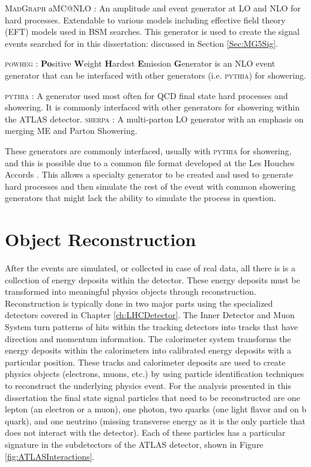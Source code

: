 \textsc{MadGraph} aMC@NLO \cite{MadGraph}: An amplitude and event generator at LO and NLO for hard processes.  Extendable to various models including effective field theory (EFT) models used in BSM searches.  This generator is used to create the signal events searched for in this dissertation: discussed in Section \ref{Sec:MG5Sig}. 

\textsc{powheg} \cite{Powheg1,Powheg2}: \textbf{Po}sitive \textbf{W}eight \textbf{H}ardest \textbf{E}mission \textbf{G}enerator is an NLO event generator that can be interfaced with other generators (i.e. \textsc{pythia}) for showering.

\textsc{pythia} \cite{Pythia8}: A generator used most often for QCD final state hard processes and showering.  It is commonly interfaced with other generators for showering within the ATLAS detector.
\textsc{sherpa} \cite{Sherpa11,Sherpa22}: A multi-parton LO generator with an emphasis on merging ME and Parton Showering.

These generators are commonly interfaced, usually with \textsc{pythia} for showering, and this is possible due to a common file format developed at the Les Houches Accords \cite{Alwall:2006yp}.  This allows a specialty generator to be created and used to generate hard processes and then simulate the rest of the event with common showering generators that might lack the ability to simulate the process in question.

\section{Object Reconstruction}

After the events are simulated, or collected in case of real data, all there is is a collection of energy deposits within the detector.  These energy deposits must be transformed into meaningful physics objects through reconstruction.  Reconstruction is typically done in two major parts using the specialized detectors covered in Chapter \ref{ch:LHCDetector}.  The Inner Detector and Muon System turn patterns of hits within the tracking detectors into tracks that have direction and momentum information.  The calorimeter system transforms the energy deposits within the calorimeters into calibrated energy deposits with a particular position.  These tracks and calorimeter deposits are used to create physics objects (electrons, muons, etc.) by using particle identification techniques to reconstruct the underlying physics event.  For the analysis presented in this dissertation the final state signal particles that need to be reconstructed are one lepton (an electron or a muon), one photon, two quarks (one light flavor and on b quark), and one neutrino (missing transverse energy as it is the only particle that does not interact with the detector).  Each of these particles has a particular signature in the subdetectors of the ATLAS detector, shown in Figure \ref{fig:ATLASInteractions}.


